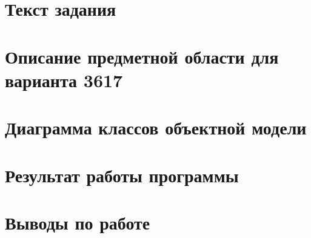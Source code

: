 \documentclass[a4paper, 11pt]{article}
\begin{document}


\tableofcontents
\vspace{2em}
\pagebreak{}

\section{Текст задания}

\pagebreak

\section{Описание предметной области для варианта 3617}

\pagebreak

\section{Диаграмма классов объектной модели}

% 

\section{Результат работы программы}

\section{Выводы по работе}

\end{document}
